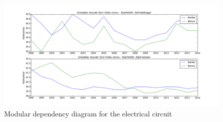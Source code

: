 \documentclass[12pt, svn, draft]{rureport}
\begin{document}
\begin{figure}
	\centering 
	\includegraphics[width=\textwidth]{../graphics/unnir_timar2.png}
	\caption{Modular dependency diagram for the electrical circuit \label{fig:unnirtimar2}}
\end{figure}

%
\printbibliography
\end{document}
